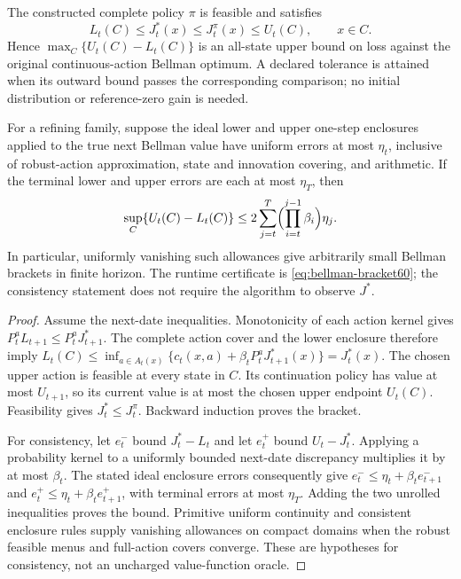 \begin{theorem}\label{thm:bellman-bracket60}
The constructed complete policy $\pi$ is feasible and satisfies
\begin{equation}\label{eq:bellman-bracket60}
 L_t(C)\le J_t^*(x)\le J_t^\pi(x)\le U_t(C),\qquad x\in C.
\end{equation}
Hence $\max_C\{U_t(C)-L_t(C)\}$ is an all-state upper bound on loss against the original continuous-action Bellman optimum. A declared tolerance is attained when its outward bound passes the corresponding comparison; no initial distribution or reference-zero gain is needed.

For a refining family, suppose the ideal lower and upper one-step enclosures applied to the true next Bellman value have uniform errors at most $\eta_t$, inclusive of robust-action approximation, state and innovation covering, and arithmetic. If the terminal lower and upper errors are each at most $\eta_T$, then
\[
 \sup_C\{U_t(C)-L_t(C)\}
 \le 2\sum_{j=t}^{T}\Bigl(\prod_{i=t}^{j-1}\beta_i\Bigr)\eta_j.
\]
In particular, uniformly vanishing such allowances give arbitrarily small Bellman brackets in finite horizon. The runtime certificate is \eqref{eq:bellman-bracket60}; the consistency statement does not require the algorithm to observe $J^*$.
\end{theorem}
\begin{proof}
Assume the next-date inequalities. Monotonicity of each action kernel gives $P_t^aL_{t+1}\le P_t^aJ_{t+1}^*$. The complete action cover and the lower enclosure therefore imply $L_t(C)\le\inf_{a\in A_t(x)}\{c_t(x,a)+\beta_tP_t^aJ_{t+1}^*(x)\}=J_t^*(x)$. The chosen upper action is feasible at every state in $C$. Its continuation policy has value at most $U_{t+1}$, so its current value is at most the chosen upper endpoint $U_t(C)$. Feasibility gives $J_t^*\le J_t^\pi$. Backward induction proves the bracket.

For consistency, let $e_t^-$ bound $J_t^*-L_t$ and let $e_t^+$ bound $U_t-J_t^*$. Applying a probability kernel to a uniformly bounded next-date discrepancy multiplies it by at most $\beta_t$. The stated ideal enclosure errors consequently give $e_t^-\le\eta_t+\beta_te_{t+1}^-$ and $e_t^+\le\eta_t+\beta_te_{t+1}^+$, with terminal errors at most $\eta_T$. Adding the two unrolled inequalities proves the bound. Primitive uniform continuity and consistent enclosure rules supply vanishing allowances on compact domains when the robust feasible menus and full-action covers converge. These are hypotheses for consistency, not an uncharged value-function oracle.
\end{proof}

